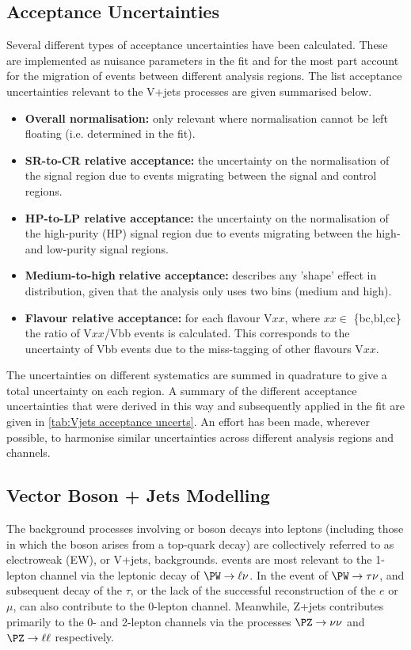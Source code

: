\subsection{Acceptance Uncertainties}
Several different types of acceptance uncertainties have been calculated. These are implemented as nuisance parameters in the fit and for the most part account for the migration of events between different analysis regions. The list acceptance uncertainties relevant to the V+jets processes are given summarised below.
%
\begin{itemize}
    \item \textbf{Overall normalisation:} only relevant where normalisation cannot be left floating (i.e. determined in the fit).
    \item \textbf{SR-to-CR relative acceptance:} the uncertainty on the normalisation of the signal region due to events migrating between the signal and control regions.
    \item \textbf{HP-to-LP relative acceptance:} the uncertainty on the normalisation of the high-purity (HP) signal region due to events migrating between the high- and low-purity signal regions.
    \item \textbf{Medium-to-high} \pTV \textbf{relative acceptance:} describes any 'shape' effect in \pTV distribution, given that the analysis only uses two \pTV bins (medium and high).
    \item \textbf{Flavour relative acceptance:} for each flavour V$xx$, where $xx\in$ \{bc,bl,cc\} the ratio of V$xx$/Vbb events is calculated. This corresponds to the uncertainty of Vbb events due to the miss-tagging of other flavours V$xx$. 
\end{itemize}
%
The uncertainties on different systematics are summed in quadrature to give a total uncertainty on each region. A summary of the different acceptance uncertainties that were derived in this way and subsequently applied in the fit are given in \cref{tab:Vjets acceptance uncerts}. An effort has been made, wherever possible, to harmonise similar uncertainties across different analysis regions and channels.


\subsection{Vector Boson + Jets Modelling}
The background processes involving \Wboson or \Zboson boson decays into leptons (including those in which the \Wboson boson arises from a top-quark decay) are collectively referred to as electroweak (EW), or V+jets, backgrounds.
\Wjets events are most relevant to the 1-lepton channel via the leptonic decay of $\Wboson \rightarrow \ell\nu$.
In the event of $\Wboson \rightarrow \tau\nu$, and subsequent decay of the $\tau$, or the lack of the successful reconstruction of the $e$ or $\mu$, \Wjets can also contribute to the 0-lepton channel.
Meanwhile, Z+jets contributes primarily to the 0- and 2-lepton channels via the processes $\Zboson \rightarrow \nu\nu$ and $\Zboson \rightarrow \ell\ell$ respectively.

